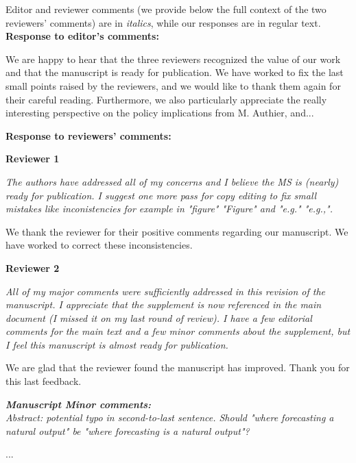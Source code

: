 \documentclass[11pt,letter]{article}
\begin{document}
\setlength{\parindent}{0cm}
\setlength{\parskip}{7pt}

Editor and reviewer comments (we provide below the full context of the two reviewers' comments) are in \emph{italics}, while our responses are in regular text. \\ 

{\bf Response to editor's comments:} 

We are happy to hear that the three reviewers recognized the value of our work and that the manuscript is ready for publication. We have worked to fix the last small points raised by the reviewers, and we would like to thank them again for their careful reading. Furthermore, we also particularly appreciate the really interesting perspective on the policy implications from M. Authier, and...

{\bf Response to reviewers' comments:} 

{\bf Reviewer 1}

\begin{mybox}
\emph{The authors have addressed all of my concerns and I believe the MS is
(nearly) ready for publication. I suggest one more pass for copy editing
to fix small mistakes like inconistencies for example in "figure"
"Figure" and "e.g." "e.g.,".}
\end{mybox}

We thank the reviewer for their positive comments regarding our manuscript. 
We have worked to correct these inconsistencies.

{\bf Reviewer 2}

\begin{mybox}
\emph{All of my major comments were sufficiently addressed in this revision of
the manuscript. I appreciate that the supplement is now referenced in
the main document (I missed it on my last round of review). I have a few
editorial comments for the main text and a few minor comments about the
supplement, but I feel this manuscript is almost ready for publication.}
\end{mybox}

We are glad that the reviewer found the manuscript has improved.
Thank you for this last feedback. 

\begin{mybox}
\emph{\textbf{Manuscript Minor comments:}\\
Abstract: potential typo in second-to-last sentence. Should "where
forecasting a natural output" be "where forecasting is a natural output"?}
\end{mybox}
...
\end{document}
